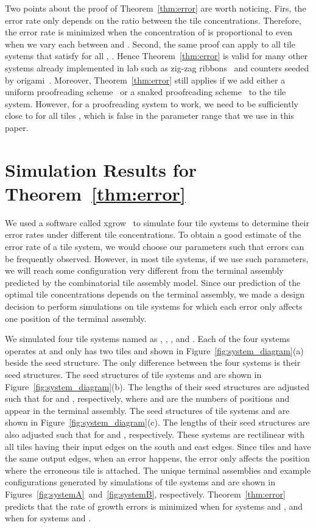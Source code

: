 \documentclass[11pt]{article}
\begin{document}
Two points about the proof of Theorem~\ref{thm:error} are worth noticing. Firs, the error rate only depends on the ratio between the tile concentrations. Therefore, the error rate is minimized when the concentration of  is proportional to  even when we vary each  between  and . Second, the same proof can apply to all tile systems that satisfy  for all , . Hence Theorem~\ref{thm:error} is valid for many other systems already implemented in lab such as zig-zag ribbons~\cite{sw05:zigzagexp} and counters seeded by origami~\cite{bsrw09:counter_origami}. Moreover, Theorem~\ref{thm:error} still applies if we add either a uniform proofreading scheme~\cite{wb02:proof} or a snaked proofreading scheme~\cite{cg04:snaked} to the tile system. However, for a proofreading system to work, we need  to be sufficiently close to  for all tiles , which is false in the parameter range that we use in this paper. 


\section{Simulation Results for Theorem~\ref{thm:error}}
\label{sec:simulation}


We used a software called xgrow~\cite{xgrow} to simulate four tile systems to determine their error rates under different tile concentrations. To obtain a good estimate of the error rate of a tile system, we would choose our parameters such that errors can be frequently observed. However, in most tile systems, if we use such parameters, we will reach some configuration very different from the terminal assembly predicted by the combinatorial tile assembly model. Since our prediction of the optimal tile concentrations depends on the terminal assembly, we made a design decision to perform simulations on tile systems for which each error only affects one position of the terminal assembly.

We simulated four tile systems named as , , , and . Each of the four systems operates at  and only has two tiles  and  shown in Figure~\ref{fig:system_diagram}(a) beside the seed structure. The only difference between the four systems is their seed structures. The seed structures of tile systems  and  are shown in Figure~\ref{fig:system_diagram}(b). The lengths of their seed structures are adjusted such that  for  and , respectively, where  and  are the numbers of positions  and  appear in the terminal assembly. The seed structures of tile systems  and  are shown in Figure~\ref{fig:system_diagram}(c). The lengths of their seed structures are also adjusted such that  for  and , respectively. These systems are rectilinear with all tiles having their input edges on the south and east edges. Since tiles  and  have the same output edges, when an error happens, the error only affects the position where the erroneous tile is attached. The unique terminal assemblies and example configurations generated by simulations of tile systems  and  are shown in Figures~\ref{fig:systemA}~and~\ref{fig:systemB}, respectively. Theorem~\ref{thm:error} predicts that the rate of growth errors is minimized when  for systems  and , and when  for systems  and .
\end{document}
